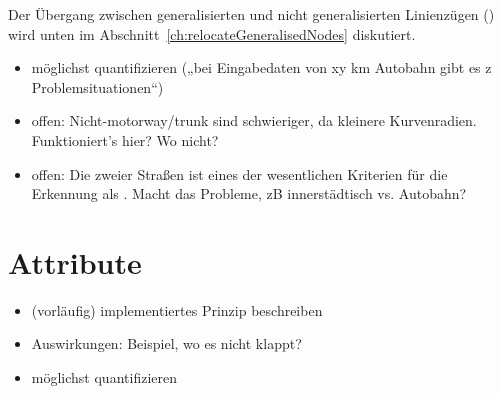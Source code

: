 \documentclass[../main/thesis.tex]{subfiles}
\begin{document}
Der Übergang zwischen generalisierten und nicht generalisierten Linienzügen () wird unten im Abschnitt~\ref{ch:relocateGeneralisedNodes} diskutiert.


\begin{itemize}
\item möglichst quantifizieren („bei Eingabedaten von xy km Autobahn gibt es z Problemsituationen“)
\item offen: Nicht-motorway/trunk sind schwieriger, da kleinere Kurvenradien. Funktioniert's hier? Wo nicht?
\item offen: Die  zweier Straßen ist eines der wesentlichen Kriterien für die Erkennung als . Macht das Probleme, zB innerstädtisch vs. Autobahn?
\end{itemize}



\section{Attribute}

\begin{itemize}
\item (vorläufig) implementiertes Prinzip beschreiben
\item Auswirkungen: Beispiel, wo es nicht klappt?
\item möglichst quantifizieren
\end{itemize}
\end{document}
